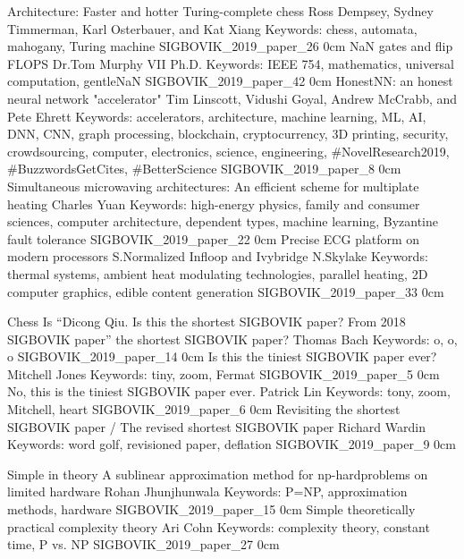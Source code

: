 \addtrack
	{}{Architecture: Faster and hotter}
\addpaper
	{Turing-complete chess}
	{Ross Dempsey, Sydney Timmerman, Karl Osterbauer, and Kat Xiang}
	{Keywords: chess, automata, mahogany, Turing machine}
	{SIGBOVIK_2019_paper_26}
	{0cm}
	{}
\addpaper
	{NaN gates and flip FLOPS}
	{Dr.\@ Tom Murphy VII Ph.D.}
	{Keywords: IEEE 754, mathematics, universal computation, gentleNaN}
	{SIGBOVIK_2019_paper_42}
	{0cm}
	{}
\addpaper
	{HonestNN: an honest neural network "accelerator"}
	{Tim Linscott, Vidushi Goyal, Andrew McCrabb, and Pete Ehrett}
	{Keywords: accelerators, architecture, machine learning, ML, AI, DNN, CNN, graph processing, blockchain, cryptocurrency, 3D printing, security, crowdsourcing, computer, electronics, science, engineering, \#NovelResearch2019, \#BuzzwordsGetCites, \#BetterScience}
	{SIGBOVIK_2019_paper_8}
	{0cm}
	{}
\addpaper
	{Simultaneous microwaving architectures: An efficient scheme for multiplate heating}
	{Charles Yuan}
	{Keywords: high-energy physics, family and consumer sciences, computer architecture, dependent types, machine learning, Byzantine fault tolerance}
	{SIGBOVIK_2019_paper_22}
	{0cm}
	{}
\addpaper
	{Precise ECG platform on modern processors}
	{S.\@ Normalized Infloop and Ivybridge N.\@ Skylake}
	{Keywords: thermal systems, ambient heat modulating technologies, parallel heating, 2D computer graphics, edible content generation}
	{SIGBOVIK_2019_paper_33}
	{0cm}
	{}

\addtrack
	{}{Chess}
\addpaper
	{Is ``Dicong Qiu. Is this the shortest SIGBOVIK paper? From 2018 SIGBOVIK paper'' the shortest SIGBOVIK paper?}
	{Thomas Bach}
	{Keywords: o, o, o}
	{SIGBOVIK_2019_paper_14}
	{0cm}
	{}
\addpaper
	{Is this the tiniest SIGBOVIK paper ever?}
	{Mitchell Jones}
	{Keywords: tiny, zoom, Fermat}
	{SIGBOVIK_2019_paper_5}
	{0cm}
	{}
\addpaper
	{No, this is the tiniest SIGBOVIK paper ever.}
	{Patrick Lin}
	{Keywords: tony, zoom, Mitchell, heart}
	{SIGBOVIK_2019_paper_6}
	{0cm}
	{}
\addpaper
	{Revisiting the shortest SIGBOVIK paper / The revised shortest SIGBOVIK paper}
	{Richard Wardin}
	{Keywords: word golf, revisioned paper, deflation}
	{SIGBOVIK_2019_paper_9}
	{0cm}
	{}

\addtrack
	{}{Simple in theory}
\addpaper
	{A sublinear approximation method for np-hardproblems on limited hardware}
	{Rohan Jhunjhunwala}
	{Keywords: P=NP, approximation methods, hardware}
	{SIGBOVIK_2019_paper_15}
	{0cm}
	{}
\addpaper
	{Simple theoretically practical complexity theory}
	{Ari Cohn}
	{Keywords: complexity theory, constant time, P vs. NP}
	{SIGBOVIK_2019_paper_27}
	{0cm}
	{}

